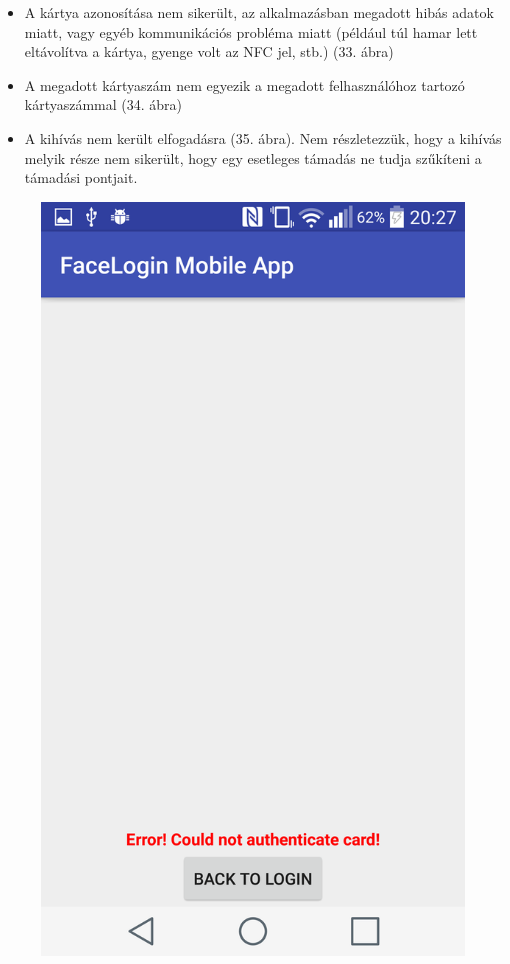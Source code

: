 \begin{itemize}
\item A kártya azonosítása nem sikerült, az alkalmazásban megadott hibás adatok miatt, vagy egyéb kommunikációs probléma miatt (például túl hamar lett eltávolítva a kártya, gyenge volt az NFC jel, stb.) (33. ábra)
\item A megadott kártyaszám nem egyezik a megadott felhasználóhoz tartozó kártyaszámmal (34. ábra)
\item A kihívás nem került elfogadásra (35. ábra). Nem részletezzük, hogy a kihívás melyik része nem sikerült, hogy egy esetleges támadás ne tudja szűkíteni a támadási pontjait.
\end{itemize}

\begin{figure}[h]
 \begin{minipage}{.30\textwidth} 
\centering
    \includegraphics[scale=0.10]{img/card_auth_fail}

\end{minipage}
\end{figure}
